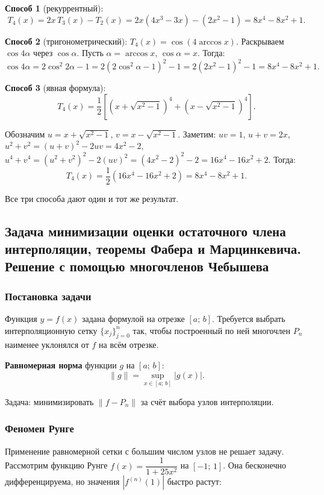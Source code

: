 \textbf{Способ 1} (рекуррентный):
\[
    T_4(x) = 2x\,T_3(x) - T_2(x) = 2x(4x^3 - 3x) - (2x^2 - 1) = 8x^4 - 8x^2 + 1.
\]

\textbf{Способ 2} (тригонометрический): $T_4(x) = \cos(4\arccos x)$. Раскрываем $\cos 4\alpha$ через $\cos\alpha$. Пусть $\alpha = \arccos x$, $\cos\alpha = x$. Тогда:
\[
    \cos 4\alpha = 2\cos^2 2\alpha - 1 = 2(2\cos^2\alpha - 1)^2 - 1 = 2(2x^2 - 1)^2 - 1 = 8x^4 - 8x^2 + 1.
\]

\textbf{Способ 3} (явная формула):
\[
    T_4(x) = \frac{1}{2}\left[\left(x + \sqrt{x^2 - 1}\right)^4 + \left(x - \sqrt{x^2 - 1}\right)^4\right].
\]

Обозначим $u = x + \sqrt{x^2 - 1}$, $v = x - \sqrt{x^2 - 1}$. Заметим: $uv = 1$, $u + v = 2x$, $u^2 + v^2 = (u+v)^2 - 2uv = 4x^2 - 2$, $u^4 + v^4 = (u^2 + v^2)^2 - 2(uv)^2 = (4x^2 - 2)^2 - 2 = 16x^4 - 16x^2 + 2$. Тогда:
\[
    T_4(x) = \frac{1}{2}(16x^4 - 16x^2 + 2) = 8x^4 - 8x^2 + 1.
\]

Все три способа дают один и тот же результат.


\newpage
\subsection{Задача минимизации оценки остаточного члена интерполяции, теоремы Фабера и Марцинкевича. Решение с помощью многочленов Чебышева}

\subsubsection*{Постановка задачи}

Функция $y = f(x)$ задана формулой на отрезке $[a;\,b]$. Требуется выбрать интерполяционную сетку $\{x_j\}_{j=0}^{n}$ так, чтобы построенный по ней многочлен $P_n$ наименее уклонялся от $f$ на всём отрезке.

\textbf{Равномерная норма} функции $g$ на $[a;\,b]$:
\[
    \|g\| = \sup_{x \in [a;\,b]} |g(x)|.
\]

Задача: минимизировать $\|f - P_n\|$ за счёт выбора узлов интерполяции.

\subsubsection*{Феномен Рунге}

Применение равномерной сетки с большим числом узлов не решает задачу. Рассмотрим функцию Рунге $f(x) = \dfrac{1}{1 + 25x^2}$ на $[-1;\,1]$. Она бесконечно дифференцируема, но значения $|f^{(n)}(1)|$ быстро растут:

